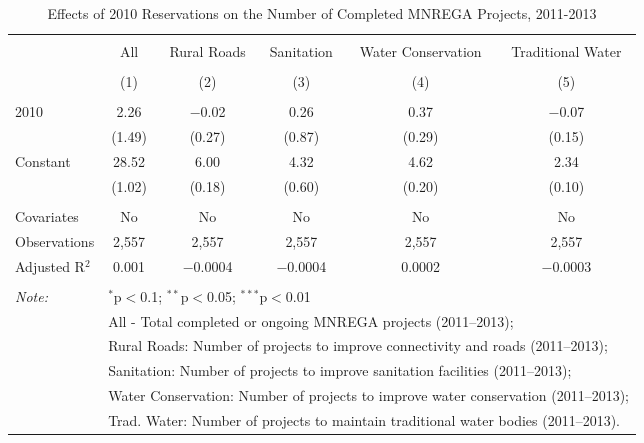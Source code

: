 
\begin{table}[!htbp] \centering 
  \caption{Effects of 2010 Reservations on the Number of Completed MNREGA Projects, 2011-2013} 
  \label{main_mnrega_10} 
\scriptsize 
\begin{tabular}{@{\extracolsep{0pt}}lccccc} 
\\[-1.8ex]\hline 
\hline \\[-1.8ex] 
 & All & Rural Roads & Sanitation & Water Conservation & Traditional Water \\ 
\\[-1.8ex] & (1) & (2) & (3) & (4) & (5)\\ 
\hline \\[-1.8ex] 
 2010 & 2.26 & $-$0.02 & 0.26 & 0.37 & $-$0.07 \\ 
  & (1.49) & (0.27) & (0.87) & (0.29) & (0.15) \\ 
  Constant & 28.52 & 6.00 & 4.32 & 4.62 & 2.34 \\ 
  & (1.02) & (0.18) & (0.60) & (0.20) & (0.10) \\ 
 \hline \\[-1.8ex] 
Covariates & No & No & No & No & No \\ 
Observations & 2,557 & 2,557 & 2,557 & 2,557 & 2,557 \\ 
Adjusted R$^{2}$ & 0.001 & $-$0.0004 & $-$0.0004 & 0.0002 & $-$0.0003 \\ 
\hline 
\hline \\[-1.8ex] 
\textit{Note:}  & \multicolumn{5}{l}{$^{*}$p$<$0.1; $^{**}$p$<$0.05; $^{***}$p$<$0.01} \\ 
 & \multicolumn{5}{l}{All - Total completed or ongoing MNREGA projects (2011--2013);} \\ 
 & \multicolumn{5}{l}{Rural Roads: Number of projects to improve connectivity and roads (2011--2013);} \\ 
 & \multicolumn{5}{l}{Sanitation:  Number of projects to improve sanitation facilities  (2011--2013);} \\ 
 & \multicolumn{5}{l}{Water Conservation: Number of projects to improve water conservation (2011--2013);} \\ 
 & \multicolumn{5}{l}{Trad. Water: Number of projects to maintain traditional water bodies (2011--2013).} \\ 
\end{tabular} 
\end{table} 
